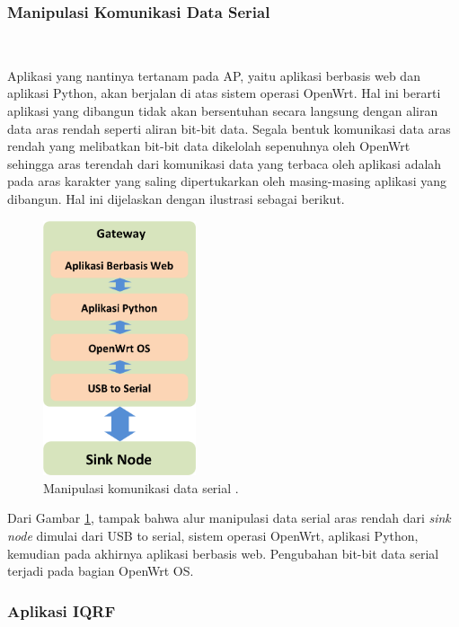 			\subsubsection{Manipulasi Komunikasi Data Serial}\

				Aplikasi yang nantinya tertanam pada AP, yaitu aplikasi berbasis web dan aplikasi Python, akan berjalan di atas sistem operasi OpenWrt. Hal ini berarti aplikasi yang dibangun tidak akan bersentuhan secara langsung dengan aliran data aras rendah seperti aliran bit-bit data. Segala bentuk komunikasi data aras rendah yang melibatkan bit-bit data dikelolah sepenuhnya oleh OpenWrt sehingga aras terendah dari komunikasi data yang terbaca oleh aplikasi adalah pada aras karakter yang saling dipertukarkan oleh masing-masing aplikasi yang dibangun. Hal ini dijelaskan dengan ilustrasi sebagai berikut.

				\begin{figure}[H]
				  \centering
				    \includegraphics[width=0.4\textwidth]{gambar/manipulation}
				    \caption{Manipulasi komunikasi data serial \cite{wibowo2013wireless}.}
				    \label{manipulation}
				\end{figure}

				Dari Gambar \ref{manipulation}, tampak bahwa alur manipulasi data serial aras rendah dari \emph{sink node} dimulai dari USB to serial, sistem operasi OpenWrt, aplikasi Python, kemudian pada akhirnya aplikasi berbasis web. Pengubahan bit-bit data serial terjadi pada bagian OpenWrt OS.

			\subsubsection{Aplikasi IQRF}\

